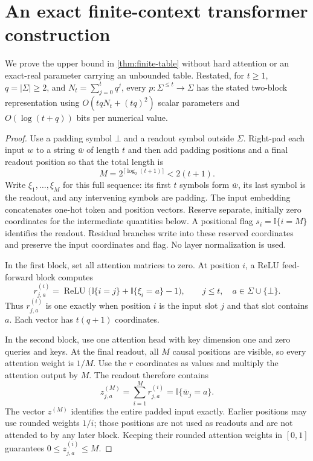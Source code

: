 \documentclass[11pt,twoside]{article}
\newcommand{\I}{\mathbb I}
\theoremstyle{definition}
\theoremstyle{remark}
\begin{document}
\appendix
\section{An exact finite-context transformer construction}
\label{app:finite-table}

We prove the upper bound in \cref{thm:finite-table} without hard attention
or an exact-real parameter carrying an unbounded table. Restated, for
$t\geq1$, $q=|\Sigma|\geq2$, and $N_t=\sum_{j=0}^tq^j$, every
$p:\Sigma^{\leq t}\to\Sigma$ has the stated two-block representation
using $O(tqN_t+(tq)^2)$ scalar parameters and $O(\log(t+q))$ bits per
numerical value.

\begin{proof}
Use a padding symbol $\bot$ and a readout symbol outside $\Sigma$.
Right-pad each input $w$ to a string $\bar w$ of length $t$ and then add
padding positions and a final readout position so that the total length is
\[
 M=2^{\lceil\log_2(t+1)\rceil}<2(t+1).
\]
Write $\xi_1,\ldots,\xi_M$ for this full sequence: its first $t$
symbols form $\bar w$, its last symbol is the readout, and any intervening
symbols are padding.
The input embedding concatenates one-hot token and position vectors.
Reserve separate, initially zero coordinates for the intermediate
quantities below. A positional flag $s_i=\I\{i=M\}$ identifies the readout.
Residual branches write into these reserved coordinates and preserve the
input coordinates and flag. No layer normalization is used.

In the first block, set all attention matrices to zero. At position $i$, a
ReLU feed-forward block computes
\[
 r_{j,a}^{(i)}
 =\operatorname{ReLU}\bigl(\I\{i=j\}+\I\{\xi_i=a\}-1\bigr),
 \qquad j\leq t,\quad a\in\Sigma\cup\{\bot\}.
\]
Thus $r_{j,a}^{(i)}$ is one exactly when position $i$ is the input slot $j$
and that slot contains $a$. Each vector has $t(q+1)$ coordinates.

In the second block, use one attention head with key dimension one and
zero queries and keys. At the final readout, all $M$ causal positions are
visible, so every attention weight is $1/M$. Use the $r$ coordinates as
values and multiply the attention output by $M$. The readout therefore
contains
\[
 z_{j,a}^{(M)}=\sum_{i=1}^{M}r_{j,a}^{(i)}=\I\{\bar w_j=a\}.
\]
The vector $z^{(M)}$ identifies the entire padded input exactly. Earlier
positions may use rounded weights $1/i$; those positions are not used as
readouts and are not attended to by any later block. Keeping their
rounded attention weights in $[0,1]$ guarantees
$0\leq z_{j,a}^{(i)}\leq M$.


\end{proof}
\end{document}
